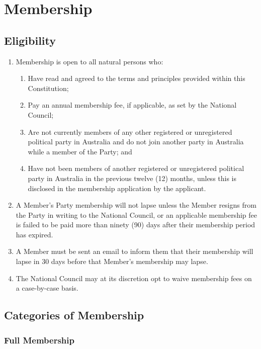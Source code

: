 \documentclass[a4paper,titlepage,8.5pt]{article}
\begin{document}
\section{Membership}

\subsection{Eligibility}

\begin{enumerate}
\item Membership is open to all natural persons who:
\begin{enumerate}
\item Have read and agreed to the terms and principles provided within this Constitution;
\item Pay an annual membership fee, if applicable, as set by the National Council;
\item Are not currently members of any other registered or unregistered political party in Australia and do not join another party in Australia while a member of the Party; and
\item Have not been members of another registered or unregistered political party in Australia in the previous twelve (12) months, unless this is disclosed in the membership application by the applicant.
\end{enumerate}
\item A Member's Party membership will not lapse unless the Member resigns from the Party in writing to the National Council, or an applicable membership fee is failed to be paid more than ninety (90) days after their membership period has expired.
\item A Member must be sent an email to inform them that their membership will lapse in 30 days before that Member's membership may lapse.
\item The National Council may at its discretion opt to waive membership fees on a case-by-case basis.
\end{enumerate}

\subsection{Categories of Membership}

\subsubsection{Full Membership}
\end{document}
